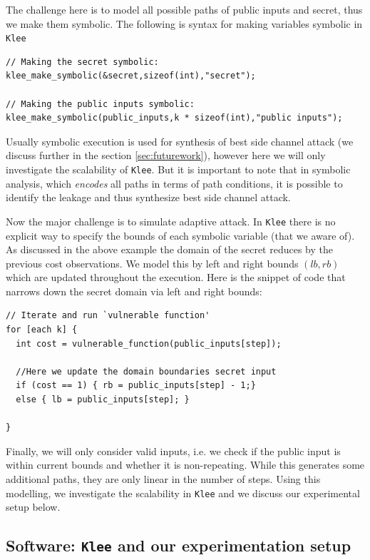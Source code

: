 \documentclass[11pt,a4paper,notitlepage]{article}
\begin{document}
The challenge here is to model all possible paths of public inputs and secret, thus we make them symbolic.
The following is syntax for making variables symbolic in \texttt{Klee}
\begin{verbatim}
// Making the secret symbolic:
klee_make_symbolic(&secret,sizeof(int),"secret");

// Making the public inputs symbolic:
klee_make_symbolic(public_inputs,k * sizeof(int),"public inputs");
\end{verbatim}

Usually symbolic execution is used for synthesis of best side channel attack (we discuss further in the section \ref{sec:futurework}), however here we will only investigate the scalability of \texttt{Klee}.
But it is important to note that in symbolic analysis, which \emph{encodes} all paths in terms of path conditions, it is possible to identify the leakage and thus synthesize best side channel attack.

Now the major challenge is to simulate adaptive attack. In \texttt{Klee} there is no explicit way to specify the bounds of each symbolic variable (that we aware of).
As discussed in the above example the domain of the secret reduces by the previous cost observations. We model this by left and right bounds $(lb, rb)$ which are updated throughout the execution.
Here is the snippet of code that narrows down the secret domain via left and right bounds:
\begin{verbatim}
// Iterate and run `vulnerable function'
for [each k] {
  int cost = vulnerable_function(public_inputs[step]);

  //Here we update the domain boundaries secret input
  if (cost == 1) { rb = public_inputs[step] - 1;}
  else { lb = public_inputs[step]; }

}
\end{verbatim}

Finally, we will only consider valid inputs, i.e. we check if the public input is within current bounds and whether it is non-repeating.
While this generates some additional paths, they are only linear in the number of steps.
Using this modelling, we investigate the scalability in \texttt{Klee} and we discuss our experimental setup below.

\subsection{Software: \texttt{Klee} and our experimentation setup}
\label{subsec:softwares}
\end{document}
